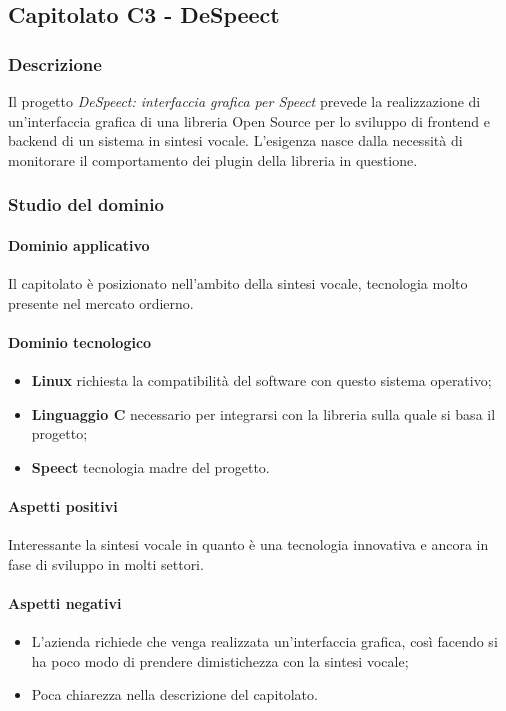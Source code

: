 	
	\subsection{Capitolato C3 - DeSpeect}
	\subsubsection{Descrizione}	
		Il progetto \emph{DeSpeect: interfaccia grafica per Speect} prevede la realizzazione di un'interfaccia grafica di una libreria Open Source per lo sviluppo di frontend e backend di un sistema in sintesi vocale.
		L'esigenza nasce dalla necessità di monitorare il comportamento dei plugin della libreria in questione.
	\subsubsection{Studio del dominio}
	
	\paragraph{Dominio applicativo} \Spazio
     Il capitolato è posizionato nell'ambito della sintesi vocale, tecnologia molto presente nel mercato ordierno. 
	\paragraph{Dominio tecnologico}
	\begin{itemize}
		\item \textbf{Linux} richiesta la compatibilità del software con questo sistema operativo;
		\item  \textbf{Linguaggio C} necessario per integrarsi con la libreria sulla quale si basa il progetto;
		\item  \textbf{Speect} tecnologia madre del progetto.
	\end{itemize}
	\paragraph{Aspetti positivi} \Spazio
	Interessante la sintesi vocale in quanto è una tecnologia innovativa e ancora in fase di sviluppo in molti settori.
	\paragraph{Aspetti negativi} \Spazio 
	\begin{itemize}
		\item L'azienda richiede che venga realizzata un'interfaccia grafica, così facendo si ha poco modo di prendere dimistichezza con la sintesi vocale;
		\item Poca chiarezza nella descrizione del capitolato.
	\end{itemize}

